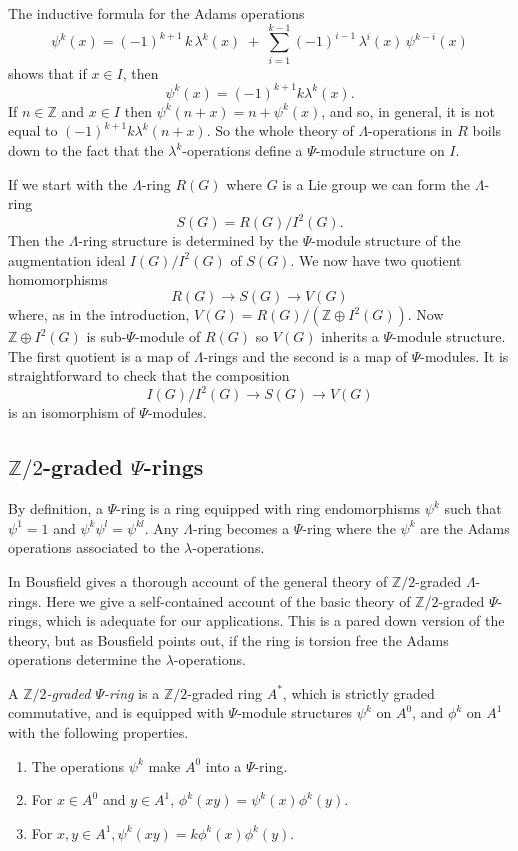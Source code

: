 \documentclass[twoside,a4paper,reqno,11pt]{amsart}
\newcommand{\Z}{\mathbb{Z}}
\begin{document}
The inductive formula for the Adams operations
\[
\psi^{k}(x)
=
(-1)^{k+1}\,k\,\lambda^{k}(x)
\;+\;
\sum_{i=1}^{k-1}(-1)^{i-1}\,\lambda^{i}(x)\,\psi^{k-i}(x)
\]
shows that if $x \in I$, then 
$$
\psi^k(x) = (-1)^{k+1}k\lambda^k(x).
$$
 If $n \in \Z$ and $x \in I$ then $\psi^k(n+x) = n + \psi^k(x)$, and so, in general, it is not equal to $(-1)^{k+1}k\lambda^k(n + x)$. So the whole theory of $\Lambda$-operations in $R$ boils down to the fact that the $\lambda^k$-operations define a $\Psi$-module structure on $I$.



If we start with the $\Lambda$-ring $R(G)$ where $G$ is a Lie group we can form the $\Lambda$-ring 
$$
S(G) = R(G)/I^2(G).
$$
Then the $\Lambda$-ring structure is determined by the $\Psi$-module structure of the augmentation ideal $I(G)/I^2(G)$ of $S(G)$.  We now have two quotient homomorphisms
$$
R(G) \to S(G) \to V(G)
$$
where, as in the introduction,  $V(G) = R(G)/(\Z \oplus  I^2(G))$.  Now $\Z \oplus I^2(G)$ is sub-$\Psi$-module of $R(G)$ so $V(G)$ inherits a $\Psi$-module structure.  The first quotient is a map of $\Lambda$-rings and the second is a map of $\Psi$-modules.  It is straightforward to check that the composition
$$
I(G)/I^2(G) \to S(G) \to V(G)
$$
is an isomorphism of $\Psi$-modules.

\subsection{$\Z/2$-graded $\Psi$-rings}
By definition, a $\Psi$-ring is a ring equipped with ring endomorphisms $\psi^k$ such that $\psi^1 = 1$ and $\psi^k\psi^l = \psi^{kl}$.  Any $\Lambda$-ring becomes a $\Psi$-ring where the $\psi^k$ are the Adams operations associated to the $\lambda$-operations.   

In \cite{MR1373816} Bousfield gives a thorough account of the general theory of $\Z/2$-graded $\Lambda$-rings.  Here we give a self-contained account of the basic theory of $\Z/2$-graded $\Psi$-rings, which is adequate for our applications. This is a pared down version of the theory, but as Bousfield points out, if the ring is torsion free the Adams operations determine the $\lambda$-operations. 

A {\em $\Z/2$-graded $\Psi$-ring} is a $\Z/2$-graded ring $A^*$, which is strictly graded commutative, and is equipped with $\Psi$-module structures $\psi^k$ on $A^0$, and $\phi^k$ on $A^1$ with the following properties.
\begin{enumerate}
\item The operations $\psi^k$ make $A^0$ into a $\Psi$-ring.
\item For $x \in A^0$ and $y \in A^1$, $\phi^k(xy) = \psi^k(x)\phi^k(y)$.
\item For $x,y \in A^1, \psi^k(xy) = k\phi^k(x)\phi^k(y)$.
\end{enumerate}
\end{document}
